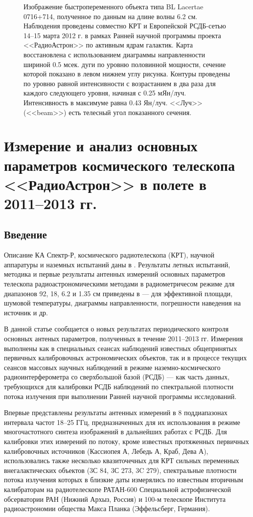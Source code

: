 \begin{figure}[]
{ }
 \caption{Изображение быстропеременного объекта типа BL Lacertae 0716+714, полученное
по данным на длине волны 6.2 см. Наблюдения проведены совместно КРТ и Европейской
РСДБ-сетью 14--15 марта 2012 г. в рамках Ранней научной программы проекта
<<РадиоАстрон>> по активным ядрам галактик. Карта восстановлена
с использованием диаграммы направленности шириной 0.5 мсек. дуги
по уровню половинной мощности, сечение которой показано в левом нижнем углу
рисунка.  Контуры проведены по уровню равной интенсивности с
возрастанием в два раза для каждого следующего уровня, начиная с 0.25 мЯн/луч.
Интенсивность в максимуме равна 0.43 Ян/луч. <<Луч>> (<<beam>>) есть телесный
угол показанного сечения.}
 \label{fig:map_0716}
\end{figure}


\section{Измерение и анализ основных параметров космического телескопа <<РадиоАстрон>> в полете в
2011--2013 гг.}

\subsection{Введение}

Описание КА Спектр-Р, космического радиотелескопа (КРТ), научной аппаратуры и наземных испытаний
даны в \cite{Khartov_2011,Alexandrov_2011a,Alexandrov_2011b}. Результаты летных испытаний, методика
и первые результаты антенных измерений основных параметров телескопа радиоастрономическими методами
в радиометричесом режиме для диапазонов 92, 18, 6.2 и 1.35 см приведены в
\cite{Avdeev_2012,Kardashev_2013_rus,RAUH} --- для эффективной площади, шумовой температуры,
диаграммы направленности, погрешности наведения на источник и др.

В данной статье сообщается о новых результатах периодического контроля основных
антеных параметров, полученных в течение 2011--2013 гг. Измерения выполнены  как
в специальных сеансах наблюдений известных общепринятых первичных калибровочных
астрономических объектов, так и в процессе текущих сеансов массовых научных
наблюдений в режиме наземно-космического радиоинтерферометра со сверхбольшой
базой (РСДБ) --- как часть данных, требующихся для калибровки РСДБ наблюдений по
спектральной плотности потока излучения при выполнении Ранней научной программы
исследований.

Впервые представлены результаты антенных измерений в 8 поддиапазонах интервала частот 18--25 ГГц,
предназначенных для их использования в режиме многочастотного синтеза изображений в дальнейших
работах с РСДБ. Для калибровки этих измерений по потоку, кроме известных протяженных первичных
калибровочных источников (Кассиопея А, Лебедь А, Краб, Дева А), использовались также несколько
квазиточечных для КРТ сильных переменных внегалактических объектов (3С 84, 3С 273, 3C 279),
спектральные плотности потока излучения которых в близкие даты измерялись по известным вторичным
калибраторам на радиотелескопе РАТАН-600 Специальной астрофизической обсерватории РАН (Нижний Архыз,
Россия) и 100-м телескопе Института радиоастрономии общества Макса Планка (Эффельсберг, Германия).

